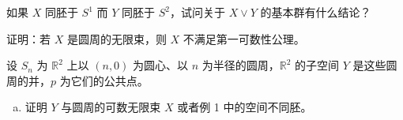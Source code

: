 \documentclass[../../main.tex]{subfiles}
\begin{document}
\begin{exercise}\label{exercise:ch11-71-03}
如果 $X$ 同胚于 $S^1$ 而 $Y$ 同胚于 $S^2$，试问关于 $X\vee Y$ 的基本群有什么结论？
\end{exercise}

\begin{exercise}\label{exercise:ch11-71-04}
证明：若 $X$ 是圆周的无限束，则 $X$ 不满足第一可数性公理。
\end{exercise}

\begin{exercise}\label{exercise:ch11-71-05}
设 $S_n$ 为 $\mathbb{R}^2$ 上以 $(n,0)$ 为圆心、以 $n$ 为半径的圆周，$\mathbb{R}^2$ 的子空间 $Y$ 是这些圆周的并，$p$ 为它们的公共点。
\begin{enumerate}[(a)]
\item 证明 $Y$ 与圆周的可数无限束 $X$ 或者例 1 中的空间不同胚。
\end{enumerate}
\end{exercise}
\end{document}
